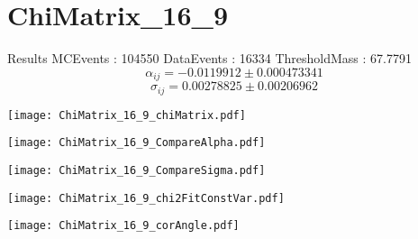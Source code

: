 \documentclass[a4paper,12pt]{article}
\begin{document}
\section{ChiMatrix\_16\_9}
\begin{minipage}{0.49\linewidth} Results \newline
MCEvents : 104550\newline
DataEvents : 16334 \newline
ThresholdMass : 67.7791\\
$$\alpha_{ij} = -0.0119912\pm 0.000473341$$
$$\sigma_{ij} = 0.00278825\pm 0.00206962$$
\end{minipage}\hfill
\begin{minipage}{0.49\linewidth} 
\texttt{[image: ChiMatrix\_16\_9\_chiMatrix.pdf]}\\
\end{minipage}
\hfill
\begin{minipage}{0.49\linewidth} 
\texttt{[image: ChiMatrix\_16\_9\_CompareAlpha.pdf]}\\
\end{minipage}
\hfill
\begin{minipage}{0.49\linewidth} 
\texttt{[image: ChiMatrix\_16\_9\_CompareSigma.pdf]}\\
\end{minipage}
\begin{minipage}{0.49\linewidth} 
\texttt{[image: ChiMatrix\_16\_9\_chi2FitConstVar.pdf]}\\
\end{minipage}
\hfill
\begin{minipage}{0.49\linewidth} 
\texttt{[image: ChiMatrix\_16\_9\_corAngle.pdf]}\\
\end{minipage}
\end{document}
